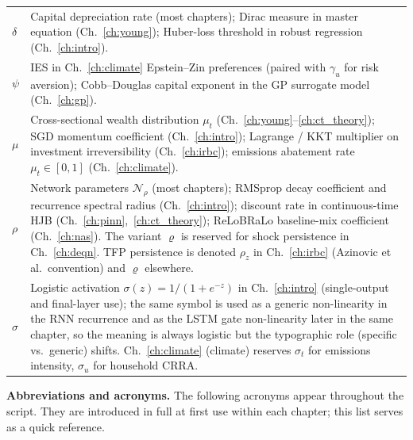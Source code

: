 \documentclass[11pt,a4paper]{report}
\begin{document}
\begin{center}
\begin{tabular}{l L{10cm}}
$\delta$ & Capital depreciation rate (most chapters); Dirac measure in master equation (Ch.~\ref{ch:young}); Huber-loss threshold in robust regression (Ch.~\ref{ch:intro}). \\
$\psi$ & IES in Ch.~\ref{ch:climate} Epstein--Zin preferences (paired with $\gamma_u$ for risk aversion); Cobb--Douglas capital exponent in the GP surrogate model (Ch.~\ref{ch:gp}). \\
$\mu$ & Cross-sectional wealth distribution $\mu_t$ (Ch.~\ref{ch:young}--\ref{ch:ct_theory}); SGD momentum coefficient (Ch.~\ref{ch:intro}); Lagrange / KKT multiplier on investment irreversibility (Ch.~\ref{ch:irbc}); emissions abatement rate $\mu_t\in[0,1]$ (Ch.~\ref{ch:climate}). \\
$\rho$ & Network parameters $\mathcal{N}_\rho$ (most chapters); RMSprop decay coefficient and recurrence spectral radius (Ch.~\ref{ch:intro}); discount rate in continuous-time HJB (Ch.~\ref{ch:pinn},~\ref{ch:ct_theory}); ReLoBRaLo baseline-mix coefficient (Ch.~\ref{ch:nas}). The variant $\varrho$ is reserved for shock persistence in Ch.~\ref{ch:deqn}.  TFP persistence is denoted $\rho_z$ in Ch.~\ref{ch:irbc} (Azinovic et al.\ convention) and $\varrho$ elsewhere. \\
$\sigma$ & Logistic activation $\sigma(z)=1/(1+e^{-z})$ in Ch.~\ref{ch:intro} (single-output and final-layer use); the same symbol is used as a generic non-linearity in the RNN recurrence and as the LSTM gate non-linearity later in the same chapter, so the meaning is always logistic but the typographic role (specific vs.\ generic) shifts. Ch.~\ref{ch:climate} (climate) reserves $\sigma_t$ for emissions intensity, $\sigma_u$ for household CRRA. \\
\bottomrule
\end{tabular}
\end{center}

\medskip
\noindent\textbf{Abbreviations and acronyms.}  The following acronyms appear throughout the script.  They are introduced in full at first use within each chapter; this list serves as a quick reference.
\end{document}
